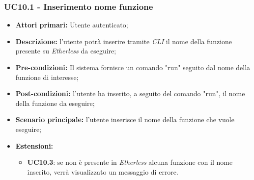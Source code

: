 \subsubsection{UC10.1 - Inserimento nome funzione}
\begin{itemize}
	\item \textbf{Attori primari:} Utente autenticato;
	\item \textbf{Descrizione:} l'utente potrà inserire tramite \textit{CLI\glo} il nome della funzione presente su \textit{Etherless} da eseguire; 
	\item \textbf{Pre-condizioni:} Il sistema fornisce un comando "run" seguito dal nome della funzione di interesse;
	\item \textbf{Post-condizioni:} l'utente ha inserito, a seguito del comando "run", il nome della funzione da eseguire;
	\item \textbf{Scenario principale:} l'utente inserisce il nome della funzione che vuole eseguire;
	\item \textbf{Estensioni:} 
	\begin{itemize}
		\item \textbf{UC10.3}: se non è presente in \textit{Etherless} alcuna funzione con il nome inserito, verrà visualizzato un messaggio di errore.
	\end{itemize}
\end{itemize}